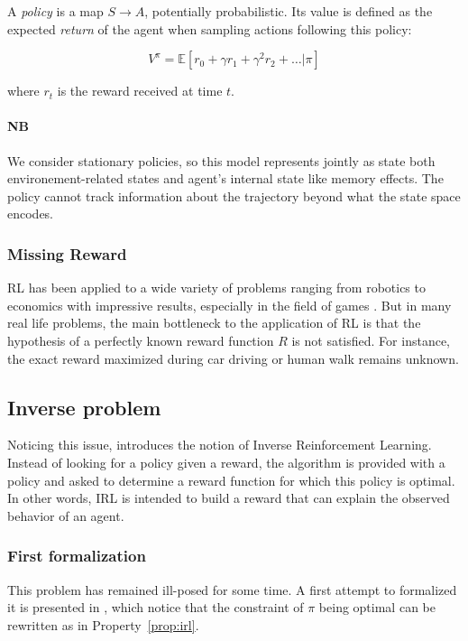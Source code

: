 \documentclass{article}
\begin{document}
A \emph{policy} is a map $S \rightarrow A$, potentially probabilistic. Its value is defined as the expected \emph{return} of the agent when sampling actions following this policy:

\[
V^{\pi} = \mathbb E[r_0 + \gamma r_1 + \gamma^2 r_2 + \dots|\pi]
\]

where $r_t$ is the reward received at time $t$.

\paragraph{NB} We consider stationary policies, so this model represents jointly as state both environement-related  states and agent's internal state like memory effects. The policy cannot track information about the trajectory beyond what the state space encodes.

\subsubsection{Missing Reward}

RL has been applied to a wide variety of problems ranging from robotics \cite{Kober13} to economics \cite{Tesauro02} with impressive results, especially in the field of games \cite{Silver16}. But in many real life problems, the main bottleneck to the application of RL is that the hypothesis of a perfectly known reward function $R$ is not satisfied. For instance, the exact reward maximized during car driving \cite{Shalev16} or human walk \cite{Morimoto04} remains unknown.

\subsection{Inverse problem}

Noticing this issue, \cite{Russell98} introduces the notion of Inverse Reinforcement Learning. Instead of looking for a policy given a reward, the algorithm is provided with a policy and asked to determine a reward function for which this policy is optimal. In other words, IRL is intended to build a reward that can explain the observed behavior of an agent.

\subsubsection{First formalization}

This problem has remained ill-posed for some time. A first attempt to formalized it is presented in \cite{Ng00}, which notice that the constraint of $\pi$ being optimal can be rewritten as in Property~\ref{prop:irl}.
\end{document}
